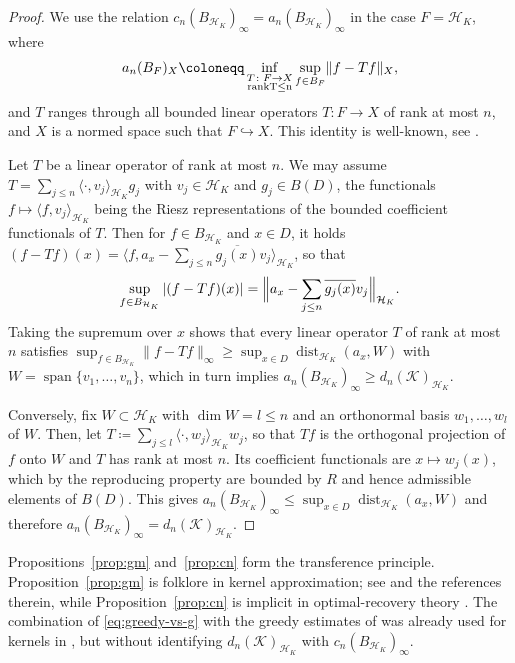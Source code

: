 \documentclass[11pt,reqno, a4paper]{article}
\numberwithin{equation}{section}
\DeclareMathOperator{\dist}{dist}
\newcommand{\ip}[2]{\langle #1,#2\rangle}
\newcommand{\norm}[1]{\lVert #1\rVert}
\DeclareMathOperator{\spann}{span}
\begin{document}
\begin{proof}
We use the relation $c_n(B_{\mathcal H_K})_\infty= a_n(B_{\mathcal H_K})_\infty$ in the case $F = \mathcal{H}_{K}$, where 
\begin{equation}
a_n(B_F)_X \coloneqq \inf_{\substack{T\colon F\to X\\ \rm{rank } T\le n}}\sup_{f\in B_F}\norm{f-Tf}_X,
\end{equation}
and $T$ ranges through all bounded linear operators $T\colon F\to X$ of rank at most $n$, and $X$ is a normed space such that $F\hookrightarrow X$. This identity is well-known, see \cite[Sect.\ 4.2.2]{NW1}.

Let $T$ be a linear operator of rank at most $n$.
We may assume $T = \sum_{j\le n}\ip{\cdot}{v_j}_{\mathcal H_K} g_j$ with $v_j\in \mathcal H_K$ and $g_j\in B(D)$, the functionals $f\mapsto\ip{f}{v_j}_{\mathcal H_K}$ being the Riesz representations of the bounded coefficient functionals of $T$.
Then for $f\in B_{\mathcal H_K}$ and $x\in D$, it holds $(f-Tf)(x) = \langle f, a_x-\sum_{j\le n}\overline{g_j(x)} v_j\rangle_{\mathcal H_K}$, so that
\begin{equation}
    \sup_{f\in B_{\mathcal H_K}}|(f-Tf)(x)| = \Bigl\| a_x-\sum_{j\le n}\overline{g_j(x)} v_j\Bigr\|_{\mathcal H_K}.
\end{equation}
Taking the supremum over $x$ shows that every linear operator $T$ of rank at most $n$ satisfies $\sup_{f\in B_{\mathcal H_K}}\norm{f-Tf}_\infty\ge\sup_{x\in D}\dist_{\mathcal H_K}(a_x,W)$ with $W=\spann\{v_1,\dots,v_n\}$, which in turn implies $a_n(B_{\mathcal H_K})_\infty\ge d_n(\mathcal{K})_{\mathcal H_K}$.

Conversely, fix $W\subset \mathcal H_K$ with $\dim W=l\le n$ and an orthonormal basis $w_1,\dots,w_l$ of $W$.
Then, let $T\coloneqq\sum_{j\le l}\ip{\cdot}{w_j}_{\mathcal H_K} w_j$, so that $Tf$ is the orthogonal projection of $f$ onto $W$ and $T$ has rank at most $n$. 
Its coefficient functionals are $x\mapsto w_j(x)$, which by the reproducing property are bounded by $R$ and hence admissible elements of $B(D)$. 
This gives $a_n(B_{\mathcal H_K})_\infty\le \sup_{x\in D}\dist_{\mathcal H_K}(a_x,W)$ and therefore $a_n(B_{\mathcal H_K})_\infty=d_n(\mathcal{K})_{\mathcal H_K}$.
\end{proof}

Propositions~\ref{prop:gm} and~\ref{prop:cn} form the transference principle. 
Proposition~\ref{prop:gm} is folklore in kernel approximation; see \cite{SH17} and the references therein, while Proposition~\ref{prop:cn} is implicit in optimal-recovery theory \cite{NW3,OP95,KWW08}.
The combination of \eqref{eq:greedy-vs-g} with the greedy estimates of \cite{DPW13} was already used for kernels in \cite{SH17}, but without identifying $d_n(\mathcal K)_{\mathcal H_K}$ with $c_n(B_{\mathcal H_K})_\infty$.
 
\end{document}
